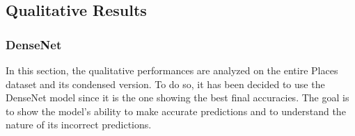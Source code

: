 \documentclass[twocolumn,superscriptaddress,aps]{revtex4-1}
\begin{document}
\subsection{Qualitative Results}\label{sec:qualitative}

\subsubsection{DenseNet}

In this section, the qualitative performances are analyzed on the entire Places dataset and its condensed version. To do so, it has been decided to use the DenseNet model since it is the one showing the best final accuracies. The goal is to show the model's ability to make accurate predictions and to understand the nature of its incorrect predictions.
\end{document}

